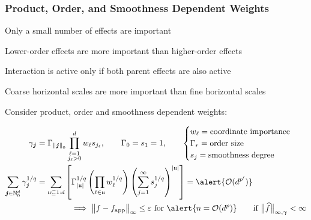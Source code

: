 \documentclass[11pt,compress,xcolor={usenames,dvipsnames},aspectratio=169]{beamer}
\newcommand{\fappx}{f_{\text{app}}}
\begin{document}
\begin{frame}
\frametitle{Product, Order, and Smoothness Dependent Weights}
\vspace{-4ex}
\begin{description}
	\setlength{\parskip}{-0.5ex}
	\item[Effect sparsity:] Only a small number of effects are important
	\item[Effect hierarchy:] Lower-order effects are more important than higher-order effects
	\item[Effect heredity:] Interaction is active only if both parent effects are also active
	\item[Effect smoothness:]  Coarse horizontal scales are more important than fine horizontal scales
\end{description}
\vspace{-3ex}

Consider \alert{product, order and smoothness dependent weights}:

\vspace{-5ex}
\begin{align*}
\gamma_{\vj} &= \Gamma_{\norm[0]{\vj}} \prod_{\substack{\ell = 1 \\ j_\ell > 0}}^d w_{\ell} s_{j_\ell}, \qquad \Gamma_0 = s_1 = 1, \qquad 
\begin{cases}
w_\ell = \text{coordinate importance} \\
\Gamma_r = \text{order size} \\
s_j =  \text{smoothness degree}
\end{cases} \\
\sum_{\vj \in \natzero^d} \gamma_{\vj}^{1/q} &= \sum_{\fu \subseteq 1:d} \left[ \Gamma_{\abs{\fu}}^{1/q}  \left(\prod_{\ell \in \fu} w_{\ell}^{1/q} \right) \left(\sum_{j=1}^{\infty} s_{j}^{1/q} \right)^{\abs{\fu}} \right] = \alert{\Order(d^{p'})}\\
& \qquad \qquad \implies \bignorm[\infty]{f - \fappx}  \le \varepsilon \text{ for } \alert{n = \Order(d^p)}
\qquad \text{if } \bignorm[\infty,\vgamma]{\hf} < \infty
\end{align*}

\end{frame}
\end{document}
